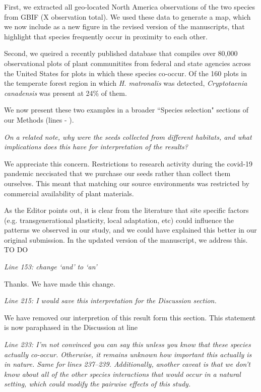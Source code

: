 \documentclass[11pt]{article}
\begin{document}
First, we extracted all geo-located North America observations of the two species from GBIF (X observation total). We used these data to generate a map, which we now include as a new figure in the revised version of the manuscripts, that highlight that species frequently occur in proximity to each other.

Second, we queired a recently published database that compiles over 80,000 observational plots of plant communitites from federal and state agencies across the United States for plots in which these species co-occur. Of the 160 plots in the temperate forest region in which \emph{H. matronalis} was detected, \emph{Cryptotaenia canadensis} was present at 24\% of them. 

We now present these two examples in a broader ``Species selection" sections of our Methods (lines - ).


\emph{On a related note, why were the seeds collected from different habitats, and what implications does this have for interpretation of the results?}

We appreciate this concern. Restrictions to research activity during the covid-19 pandemic neccisated that we purchase our seeds rather than collect them ourselves. This meant that matching our source environments was restricted by commercial availability of plant materials. 

As the Editor points out, it is clear from the literature that site specific factors (e.g.  transgenerational plasticity, local adaptation, etc) could influence the patterns we observed in our study, and we could have explained this better in our original submission. In the updated version of the manuscript, we address  this. TO DO

\emph{Line 153: change ‘and’ to ‘an’}

Thanks. We have made this change.

\emph{Line 215: I would save this interpretation for the Discussion section.}

We have removed our interpretion of this result form this section. This statement is now paraphased in the Discussion at line 

\emph{Line 233:  I’m not convinced you can say this unless you know that these species actually co-occur. Otherwise, it remains unknown how important this actually is in nature. Same for lines 237–239. Additionally, another caveat is that we don’t know about all of the other species interactions that would occur in a natural setting, which could modify the pairwise effects of this study.}
\end{document}
